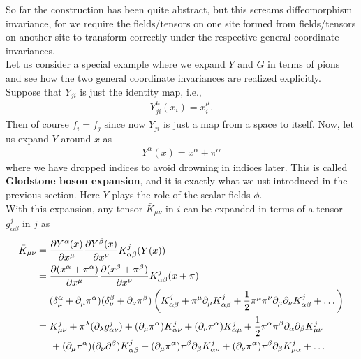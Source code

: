 \documentclass{book}
\theoremstyle{definition}
\newcommand{\p}{\partial}
\newcommand{\nn}{\nonumber}
\newcommand{\f}[2]{\frac{#1}{#2}}
\newcommand{\lp}{\left(}
\newcommand{\rp}{\right)}
\begin{document}
So far the construction has been quite abstract, but this screams diffeomorphism invariance, for we require the fields/tensors on one site formed from fields/tensors on another site to transform correctly under the respective general coordinate invariances. \\

Let us consider a special example where we expand $Y$ and $G$ in terms of pions and see how the two general coordinate invariances are realized explicitly. Suppose that $Y_{ji}$ is just the identity map, i.e.,
\begin{align}
Y_{ji}^\mu(x_i) = x^\mu_i.
\end{align}
Then of course $f_i = f_j$ since now $Y_{ji}$ is just a map from a space to itself. Now, let us expand $Y$ around $x$ as
\begin{align}
Y^\alpha(x) = x^\alpha + \pi^\alpha 
\end{align}
where we have dropped indices to avoid drowning in indices later. This is called \textbf{Glodstone boson expansion}, and it is exactly what we ust introduced in the previous section. Here $Y$ plays the role of the scalar fields $\phi$. \\

With this expansion, any tensor $\bar{K}_{\mu\nu}$ in $i$ can be expanded in terms of a tensor $g^j_{\alpha \beta}$ in $j$ as
\begin{align}
\bar{K}_{\mu\nu} &= \f{\p Y^\alpha (x)}{\p x^\mu}\f{\p Y^\beta (x)}{\p x^\nu} K^j_{\alpha\beta}(Y(x)) \nn\\
&= \f{\p (x^\alpha + \pi^\alpha)}{\p x^\mu}\f{\p (x^\beta + \pi^\beta)}{\p x^\nu} K^j_{\alpha\beta}(x + \pi) \nn\\
&= (\delta^\alpha_\mu + \p_\mu\pi^\alpha)(\delta^\beta_\nu + \p_\nu \pi^\beta)\lp K^j_{\alpha\beta} + \pi^\mu \p_\mu K^j_{\alpha\beta} + \f{1}{2}\pi^\mu \pi^\nu \p_\mu \p_\nu K^j_{\alpha\beta} + \dots \rp\nn\\
&= K^j_{\mu\nu} + \pi^\lambda (\p_\lambda g^j_{\alpha\nu}) + (\p_\mu\pi^\alpha)K^j_{\alpha\nu} + (\p_\nu \pi^\alpha)K^j_{\alpha\mu} + \f{1}{2}\pi^\alpha\pi^\beta \p_\alpha\p_\beta K^j_{\mu\nu} \nn\\
&\hspace{0.5cm} + (\p_\mu \pi^\alpha)(\p_\nu \p^\beta)K^j_{\alpha\beta} + (\p_\mu \pi^\alpha)\pi^\beta \p_\beta K^j_{\alpha\nu} + (\p_\nu \pi^\alpha)\pi^\beta \p_\beta K^j_{\mu\alpha} + \dots
\end{align}

        
\end{document}
